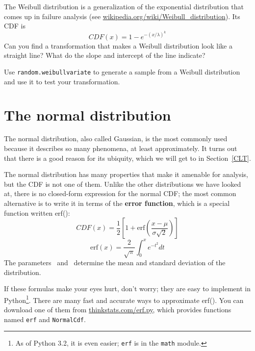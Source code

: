 \documentclass[12pt]{book}
\newif\ifplastex
\begin{document}
\begin{exercise}
\ifplastex
    \Anchor{weibull}
\else
    \label{weibull}
\fi
The Weibull distribution is a generalization of the exponential
distribution that comes up in failure analysis
(see \url{wikipedia.org/wiki/Weibull_distribution}).  Its CDF is
%
\[ CDF(x) = 1 - e^{-(x / \lambda)^k} \]
%
Can you find a transformation that makes a Weibull distribution look
like a straight line?  What do the slope and intercept of the
line indicate?

Use {\tt random.weibullvariate} to generate a sample from a
Weibull distribution and use it to test your transformation.

\end{exercise}


\section{The normal distribution}
\label{normal}

\newcommand{\erf}{\mathrm{erf}}

The normal distribution, also called Gaussian, is the most commonly
used because it describes so many phenomena, at least approximately.
It turns out that there is a good reason for its ubiquity, which we
will get to in Section~\ref{CLT}.

The normal distribution has many properties that make it amenable for
analysis, but the CDF is not one of them.  Unlike the
other distributions we have looked at, there is no closed-form
expression for the normal CDF; the most common alternative is to write
it in terms of the {\bf error function}, which is a special function
written erf(\x):
%
\[ CDF(x) = \frac{1}{2} \left[ 1 +
  \erf \left( \frac{x - \mu}{\sigma \sqrt{2}} \right) \right] \]
%
\[ \erf(x) = \frac{2}{\sqrt{\pi}} \int_{0}^x e^{-t^2} dt \]
%
The parameters \mymu~and \mysigma~determine the mean and standard
deviation of the distribution.

If these formulas make your eyes hurt, don't worry; they are easy to
implement in Python\footnote{As of Python 3.2, it is even easier; 
{\tt erf} is in the {\tt math} module.}.  There are many fast and
accurate ways to approximate erf(\x).  You can download one of them
from \url{thinkstats.com/erf.py}, which provides functions named
{\tt erf} and {\tt NormalCdf}.
\end{document}
